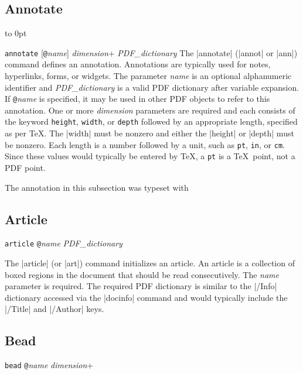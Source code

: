 {{\subsection{Annotate}
\hbox to 0pt{\hskip-1.0in\hss}
\syntax
{\tt annotate} [{\tt @}{\it name}] {\it dimension}+ {\it PDF\_dictionary}
\description
The |annotate| (|annot| or |ann|) command defines an annotation.
Annotations are typically used for
notes, hyperlinks, forms, or widgets.
The parameter {\it name} is an optional alphanumeric identifier
and {\it PDF\_dictionary} is a valid PDF dictionary after variable expansion.
If {\tt @}{\it name} is specified, it may be used in
other PDF objects to refer to this annotation.
One or more {\it dimension} parameters are required
and each consists of the keyword
{\tt height}, {\tt width}, or {\tt depth} followed
by an appropriate length, specified as per \TeX\null.
The |width| must be nonzero and either the |height| or |depth|
must be nonzero.
Each length is a number followed by a unit, such as {\tt pt},
{\tt in}, or {\tt cm}.  Since these values
would typically be entered by \TeX, a {\tt pt}
is a \TeX\ point, not a PDF point.

\example The annotation in this subsection
was typeset with
\begintt
{}
\endtt


\subsection{Article}
\syntax
{\tt article} {\tt @}{\it name} {\it PDF\_dictionary}

\description
The |article| (or |art|) command initializes an article.  An article
is a collection of boxed regions in the document that should be
read consecutively. The {\it name} parameter is required.  The required PDF dictionary 
is similar to the |/Info| dictionary accessed via the |docinfo| command
and would typically include the |/Title| and |/Author| keys.
\example
\begintt
{}
\endtt

\subsection{Bead}
\syntax
{\tt bead} {\tt @}{\it name} {\it dimension}+

}}
